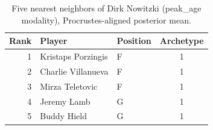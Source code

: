 \begin{table}[htbp]
  \centering\small
  \begin{tabular}{rllc}
    \toprule
    Rank & Player & Position & Archetype \\
    \midrule
    1 & Kristaps Porzingis & F & 1 \\
    2 & Charlie Villanueva & F & 1 \\
    3 & Mirza Teletovic & F & 1 \\
    4 & Jeremy Lamb & G & 1 \\
    5 & Buddy Hield & G & 1 \\
    \bottomrule
  \end{tabular}
  \caption{Five nearest neighbors of Dirk Nowitzki (peak_age modality), Procrustes-aligned posterior mean.}
  \label{tab:Dirk_Nowitzki_neighbors_peak_age}
\end{table}

